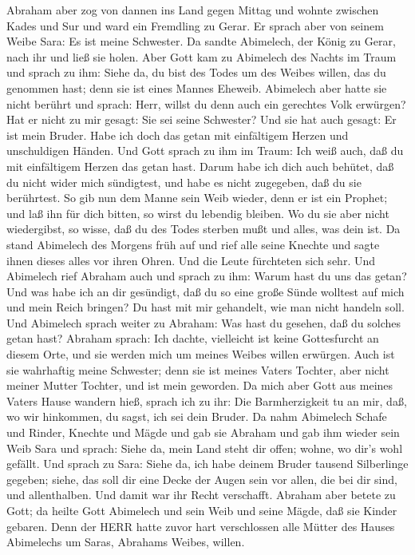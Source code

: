 Abraham aber zog von dannen ins Land gegen Mittag und
wohnte zwischen Kades und Sur und ward ein Fremdling zu Gerar.
 Er sprach aber von seinem Weibe Sara: Es ist meine
Schwester. Da sandte Abimelech, der König zu Gerar, nach ihr und ließ
sie holen.  Aber Gott kam zu Abimelech des Nachts im Traum
und sprach zu ihm: Siehe da, du bist des Todes um des Weibes willen, das
du genommen hast; denn sie ist eines Mannes Eheweib. 
Abimelech aber hatte sie nicht berührt und sprach: Herr, willst du denn
auch ein gerechtes Volk erwürgen?  Hat er nicht zu mir
gesagt: Sie sei seine Schwester? Und sie hat auch gesagt: Er ist mein
Bruder. Habe ich doch das getan mit einfältigem Herzen und unschuldigen
Händen.  Und Gott sprach zu ihm im Traum: Ich weiß auch, daß
du mit einfältigem Herzen das getan hast. Darum habe ich dich auch
behütet, daß du nicht wider mich sündigtest, und habe es nicht
zugegeben, daß du sie berührtest.  So gib nun dem Manne sein
Weib wieder, denn er ist ein Prophet; und laß ihn für dich bitten, so
wirst du lebendig bleiben. Wo du sie aber nicht wiedergibst, so wisse,
daß du des Todes sterben mußt und alles, was dein ist.  Da
stand Abimelech des Morgens früh auf und rief alle seine Knechte und
sagte ihnen dieses alles vor ihren Ohren. Und die Leute fürchteten sich
sehr.  Und Abimelech rief Abraham auch und sprach zu ihm:
Warum hast du uns das getan? Und was habe ich an dir gesündigt, daß du
so eine große Sünde wolltest auf mich und mein Reich bringen? Du hast
mit mir gehandelt, wie man nicht handeln soll.  Und
Abimelech sprach weiter zu Abraham: Was hast du gesehen, daß du solches
getan hast?  Abraham sprach: Ich dachte, vielleicht ist
keine Gottesfurcht an diesem Orte, und sie werden mich um meines Weibes
willen erwürgen.  Auch ist sie wahrhaftig meine Schwester;
denn sie ist meines Vaters Tochter, aber nicht meiner Mutter Tochter,
und ist mein geworden.  Da mich aber Gott aus meines Vaters
Hause wandern hieß, sprach ich zu ihr: Die Barmherzigkeit tu an mir,
daß, wo wir hinkommen, du sagst, ich sei dein Bruder.  Da
nahm Abimelech Schafe und Rinder, Knechte und Mägde und gab sie Abraham
und gab ihm wieder sein Weib Sara  und sprach: Siehe da,
mein Land steht dir offen; wohne, wo dir's wohl gefällt. 
Und sprach zu Sara: Siehe da, ich habe deinem Bruder tausend Silberlinge
gegeben; siehe, das soll dir eine Decke der Augen sein vor allen, die
bei dir sind, und allenthalben. Und damit war ihr Recht verschafft.
 Abraham aber betete zu Gott; da heilte Gott Abimelech und
sein Weib und seine Mägde, daß sie Kinder gebaren.  Denn
der HERR hatte zuvor hart verschlossen alle Mütter des Hauses Abimelechs
um Saras, Abrahams Weibes, willen.

